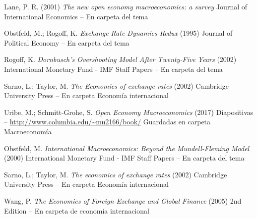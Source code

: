 \documentclass{nuevotema}
\begin{document}
Lane, P. R. (2001) \textit{The new open economy macroeconomics: a survey} Journal of International Economics -- En carpeta del tema

Obstfeld, M.; Rogoff, K. \textit{Exchange Rate Dynamics Redux} (1995) Journal of Political Economy -- En carpeta del tema

Rogoff, K. \textit{Dornbusch's Overshooting Model After Twenty-Five Years} (2002) International Monetary Fund - IMF Staff Papers -- En carpeta del tema

Sarno, L.; Taylor, M. \textit{The Economics of exchange rates} (2002) Cambridge University Press -- En carpeta Economía internacional

Uribe, M.; Schmitt-Grohe, S. \textit{Open Economy Macroeconomics} (2017) Diapositivas -- \url{http://www.columbia.edu/~mu2166/book/} Guardadas en carpeta Macroeconomía

Obstfeld, M. \textit{International Macroeconomics: Beyond the Mundell-Fleming Model} (2000) International Monetary Fund - IMF Staff Papers -- En carpeta del tema

Sarno, L.; Taylor, M. \textit{The economics of exchange rates} (2002) Cambridge University Press -- En carpeta Economía internacional

Wang, P. \textit{The Economics of Foreign Exchange and Global Finance} (2005) 2nd Edition -- En carpeta de economía internacional
\end{document}
